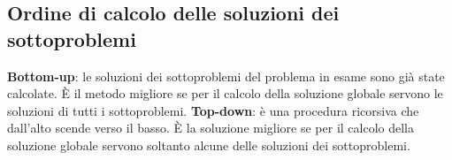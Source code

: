 \subsection*{Ordine di calcolo delle soluzioni dei sottoproblemi}

\textbf{Bottom-up}: le soluzioni dei sottoproblemi del problema in esame sono già state calcolate. È il metodo migliore se per il calcolo della soluzione globale servono le soluzioni di tutti i sottoproblemi.
\linebreak
\linebreak
\textbf{Top-down}: è una procedura ricorsiva che dall'alto scende verso il basso. È la soluzione migliore se per il calcolo della soluzione globale servono soltanto alcune delle soluzioni dei sottoproblemi.